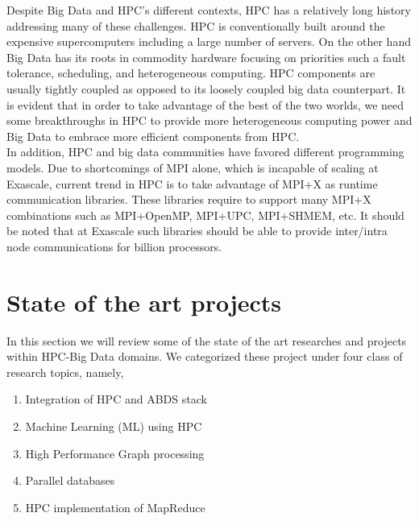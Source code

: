 \documentclass[runningheads,a4paper]{llncs}
\begin{document}
Despite Big Data and HPC's different contexts, HPC has a relatively long history addressing many of these challenges. HPC is conventionally built around the expensive supercomputers including a large number of servers. On the other hand Big Data has its roots in commodity hardware focusing on priorities such a fault tolerance, scheduling, and heterogeneous computing. HPC components are usually tightly coupled as opposed to its loosely coupled big data counterpart. It is evident that in order to take advantage of the best of the two worlds, we need some breakthroughs in HPC to provide more heterogeneous computing power and Big Data to embrace more efficient components from HPC.\\

In addition, HPC and big data communities have favored different programming models. Due to shortcomings of MPI alone, which is incapable of scaling at Exascale, current trend in HPC is to take advantage of MPI+X as runtime communication libraries. These libraries require to support many MPI+X combinations such as MPI+OpenMP, MPI+UPC, MPI+SHMEM, etc. It should be noted that at Exascale such libraries should be able to provide inter/intra node communications for billion processors.  


\section{State of the art projects}
In this section we will review some of the state of the art researches and projects within HPC-Big Data domains. We categorized these project under four class of research topics, namely,
\begin{enumerate}
	\item Integration of HPC and ABDS stack
	\item Machine Learning (ML) using HPC
	\item High Performance Graph processing
	\item Parallel databases
	\item HPC implementation of MapReduce 
	
\end{enumerate}
\end{document}
